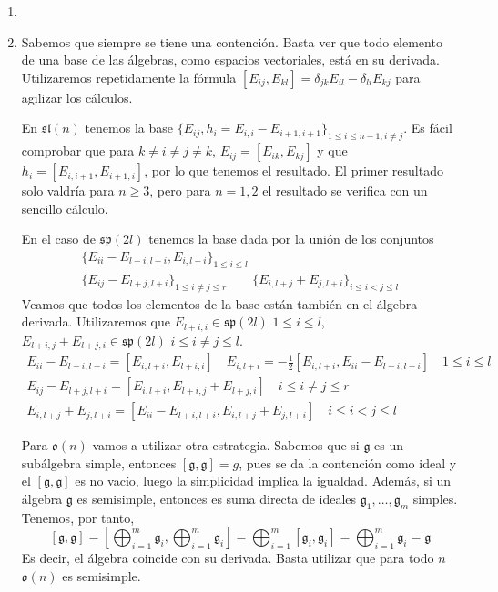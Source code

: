 \documentclass[twoside]{article}
\begin{document}
\begin{solucion}
\begin{enumerate}
\item[]
\item Sabemos que siempre se tiene una contención. Basta ver que todo elemento de una base de las álgebras, como espacios vectoriales, está en su derivada. Utilizaremos repetidamente la fórmula $[E_{ij},E_{kl}]=\delta_{jk}E_{il}-\delta_{li}E_{kj}$ para agilizar los cálculos.

En $\mathfrak{sl}(n)$ tenemos la base $\{E_{ij}, h_i=E_{i,i}-E_{i+1,i+1}\}_{1\leq i\leq n-1, i\neq j}$. Es fácil comprobar que para $k\neq i\neq j\neq k$, $E_{ij}=[E_{ik},E_{kj}]$ y que $h_i=[E_{i,i+1},E_{i+1,i}]$, por lo que tenemos el resultado. El primer resultado solo valdría para $n\geq 3$, pero para $n=1,2$ el resultado se verifica con un sencillo cálculo.

En el caso de $\mathfrak{sp}(2l)$ tenemos la base dada por la unión de los conjuntos
\begin{gather*}
\{E_{ii}-E_{l+i,l+i}, E_{i,l+i}\}_{1\leq i \leq l} \\
\{E_{ij}-E_{l+j,l+i}\}_{1\leq i\neq j\leq r} \qquad \{E_{i,l+j}+E_{j,l+i}\}_{i\leq i<j\leq l}
\end{gather*}
Veamos que todos los elementos de la base están también en el álgebra derivada. Utilizaremos que $E_{l+i,i} \in \mathfrak{sp}(2l)$ $1\leq i \leq l$, $E_{l+i,j}+E_{l+j,i} \in \mathfrak{sp}(2l)$ $i \leq i\neq j \leq l$.
\begin{gather*}
E_{ii}-E_{l+i,l+i}=[E_{i,l+i},E_{l+i,i}] \quad E_{i,l+i} = -\frac{1}{2}[E_{i,l+i},E_{ii}-E_{l+i,l+i}] \quad 1\leq i \leq l\\
E_{ij}-E_{l+j,l+i}=[E_{i,l+i},E_{l+i,j}+E_{l+j,i}] \quad i \leq i \neq j \leq r\\
E_{i,l+j}+E_{j,l+i}=[E_{ii}-E_{l+i,l+i},E_{i,l+j}+E_{j,l+i}]\quad i \leq i < j \leq l
\end{gather*}

Para $\mathfrak{o}(n)$ vamos a utilizar otra estrategia. Sabemos que si $\mathfrak{g}$ es un subálgebra simple, entonces $[\mathfrak{g},\mathfrak{g}] = g$, pues se da la contención como ideal y el $[\mathfrak{g},\mathfrak{g}]$ es no vacío, luego la simplicidad implica la igualdad.  Además, si un álgebra $\mathfrak{g}$ es semisimple, entonces es suma directa de ideales $\mathfrak{g}_1,\dotsc,\mathfrak{g}_m$ simples. Tenemos, por tanto,
$$
[\mathfrak{g},\mathfrak{g}] = \left[\bigoplus_{i=1}^m \mathfrak{g}_i,\bigoplus_{i=1}^m \mathfrak{g}_i\right] = \bigoplus_{i=1}^m [\mathfrak{g}_i,\mathfrak{g}_i] =\bigoplus_{i=1}^m \mathfrak{g}_i = \mathfrak{g}
$$
Es decir, el álgebra coincide con su derivada. Basta utilizar que para todo $n$ $\mathfrak{o}(n)$ es semisimple.


\end{enumerate}
\end{solucion}
\end{document}

